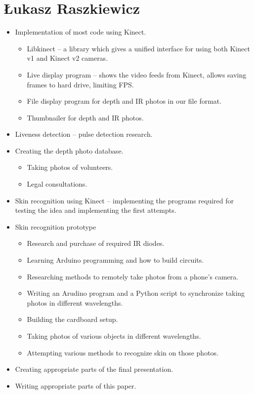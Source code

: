     \section{Łukasz Raszkiewicz}
        \begin{itemize}
            \item Implementation of most code using Kinect.
            \begin{itemize}
                \item Libkinect -- a library which gives a unified interface for
                      using both Kinect v1 and Kinect v2 cameras.
                \item Live display program -- shows the video feeds from Kinect,
                      allows saving frames to hard drive, limiting FPS.
                \item File display program for depth and IR photos in our file format.
                \item Thumbnailer for depth and IR photos.
            \end{itemize}
            \item Liveness detection -- pulse detection research.
            \item Creating the depth photo database.
            \begin{itemize}
                \item Taking photos of volunteers.
                \item Legal consultations.
            \end{itemize}
            \item Skin recognition using Kinect -- implementing the programs required
                  for testing the idea and implementing the first attempts.
            \item Skin recognition prototype
            \begin{itemize}
                \item Research and purchase of required IR diodes.
                \item Learning Arduino programming and how to build circuits.
                \item Researching methods to remotely take photos from a phone's camera.
                \item Writing an Arudino program and a Python script to synchronize
                      taking photos in different wavelengths.
                \item Building the cardboard setup.
                \item Taking photos of various objects in different wavelengths.
                \item Attempting various methods to recognize skin on those photos.
            \end{itemize}
            \item Creating appropriate parts of the final presentation.
            \item Writing appropriate parts of this paper.
        \end{itemize}


